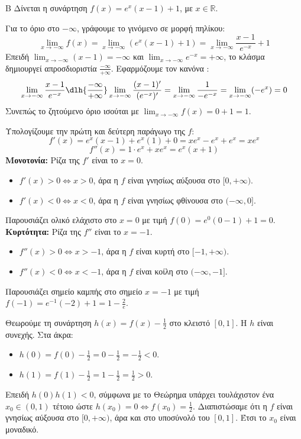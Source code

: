 \begin{thema}{Β}
Δίνεται η συνάρτηση $f(x) = e^x(x-1) + 1$, με $x \in \mathbb{R}$.
\begin{erwthma}
\item Για το όριο στο $-\infty$, γράφουμε το γινόμενο σε μορφή πηλίκου:
\[ \lim_{x\to-\infty} f(x) = \lim_{x\to-\infty} (e^x(x-1) + 1) = \lim_{x\to-\infty} \frac{x-1}{e^{-x}} + 1 \]
Επειδή $\lim_{x\to-\infty} (x-1) = -\infty$ και $\lim_{x\to-\infty} e^{-x} = +\infty$, το κλάσμα δημιουργεί απροσδιοριστία $\frac{-\infty}{+\infty}$. Εφαρμόζουμε τον κανόνα :
\[ \lim_{x\to-\infty} \frac{x-1}{e^{-x}} \dlh{\frac{-\infty}{+\infty}} \lim_{x\to-\infty} \frac{(x-1)'}{(e^{-x})'} = \lim_{x\to-\infty} \frac{1}{-e^{-x}} = \lim_{x\to-\infty} (-e^x) = 0 \]
Συνεπώς το ζητούμενο όριο ισούται με $\lim_{x\to-\infty} f(x) = 0 + 1 = 1$.

\item Υπολογίζουμε την πρώτη και δεύτερη παράγωγο της $f$:
\[ f'(x) = e^x(x-1) + e^x(1) + 0 = x e^x - e^x + e^x = x e^x \]
\[ f''(x) = 1 \cdot e^x + x e^x = e^x(x+1) \]
\textbf{Μονοτονία:}
Ρίζα της $f'$ είναι το $x=0$.
\begin{itemize}
\item $f'(x) > 0 \Leftrightarrow x > 0$, άρα η $f$ είναι γνησίως αύξουσα στο $[0, +\infty)$.
\item $f'(x) < 0 \Leftrightarrow x < 0$, άρα η $f$ είναι γνησίως φθίνουσα στο $(-\infty, 0]$.
\end{itemize}
Παρουσιάζει ολικό ελάχιστο στο $x=0$ με τιμή $f(0) = e^0(0-1)+1 = 0$.
\textbf{Κυρτότητα:}
Ρίζα της $f''$ είναι το $x=-1$.
\begin{itemize}
\item $f''(x) > 0 \Leftrightarrow x > -1$, άρα η $f$ είναι κυρτή στο $[-1, +\infty)$.
\item $f''(x) < 0 \Leftrightarrow x < -1$, άρα η $f$ είναι κοίλη στο $(-\infty, -1]$.
\end{itemize}
Παρουσιάζει σημείο καμπής στο σημείο $x=-1$ με τιμή $f(-1) = e^{-1}(-2) + 1 = 1 - \frac{2}{e}$.

\item Θεωρούμε τη συνάρτηση $h(x) = f(x) - \frac{1}{2}$ στο κλειστό $[0, 1]$.
Η $h$ είναι συνεχής. Στα άκρα:
\begin{itemize}
\item $h(0) = f(0) - \frac{1}{2} = 0 - \frac{1}{2} = -\frac{1}{2} < 0$.
\item $h(1) = f(1) - \frac{1}{2} = 1 - \frac{1}{2} = \frac{1}{2} > 0$.
\end{itemize}
Επειδή $h(0)h(1) < 0$, σύμφωνα με το Θεώρημα  υπάρχει τουλάχιστον ένα $x_0 \in (0, 1)$ τέτοιο ώστε $h(x_0)=0 \Leftrightarrow f(x_0) = \frac{1}{2}$.
Διαπιστώσαμε ότι η $f$ είναι γνησίως αύξουσα στο $[0, +\infty)$, άρα και στο υποσύνολό του $[0, 1]$. Έτσι το $x_0$ είναι μοναδικό.


\end{erwthma}
\end{thema}
